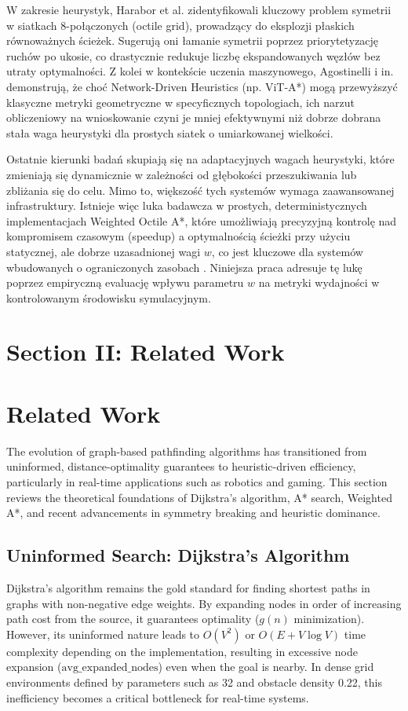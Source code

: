 \documentclass[conference]{IEEEtran}
\begin{document}
W zakresie heurystyk, Harabor et al. \cite{harabor2023octile} zidentyfikowali kluczowy problem symetrii w siatkach 8-połączonych (octile grid), prowadzący do eksplozji płaskich równoważnych ścieżek. Sugerują oni łamanie symetrii poprzez priorytetyzację ruchów po ukosie, co drastycznie redukuje liczbę ekspandowanych węzłów bez utraty optymalności. Z kolei w kontekście uczenia maszynowego, Agostinelli i in. \cite{agostinelli2024learned} demonstrują, że choć Network-Driven Heuristics (np. ViT-A*) mogą przewyższyć klasyczne metryki geometryczne w specyficznych topologiach, ich narzut obliczeniowy na wnioskowanie czyni je mniej efektywnymi niż dobrze dobrana stała waga heurystyki dla prostych siatek o umiarkowanej wielkości.

Ostatnie kierunki badań \cite{chen2024focal, shperberg2024deadline} skupiają się na adaptacyjnych wagach heurystyki, które zmieniają się dynamicznie w zależności od głębokości przeszukiwania lub zbliżania się do celu. Mimo to, większość tych systemów wymaga zaawansowanej infrastruktury. Istnieje więc luka badawcza w prostych, deterministycznych implementacjach Weighted Octile A*, które umożliwiają precyzyjną kontrolę nad kompromisem czasowym (speedup) a optymalnością ścieżki przy użyciu statycznej, ale dobrze uzasadnionej wagi \(w\), co jest kluczowe dla systemów wbudowanych o ograniczonych zasobach \cite{zhang2025hardware}. Niniejsza praca adresuje tę lukę poprzez empiryczną evaluację wpływu parametru \(w\) na metryki wydajności w kontrolowanym środowisku symulacyjnym.

\section{Section II: Related Work}
\section{Related Work}
\label{sec:related_work}

The evolution of graph-based pathfinding algorithms has transitioned from uninformed, distance-optimality guarantees to heuristic-driven efficiency, particularly in real-time applications such as robotics and gaming. This section reviews the theoretical foundations of Dijkstra's algorithm, A* search, Weighted A*, and recent advancements in symmetry breaking and heuristic dominance.

\subsection{Uninformed Search: Dijkstra's Algorithm}
Dijkstra's algorithm \cite{dijkstra1959note} remains the gold standard for finding shortest paths in graphs with non-negative edge weights. By expanding nodes in order of increasing path cost from the source, it guarantees optimality ($g(n)$ minimization). However, its uninformed nature leads to $O(V^2)$ or $O(E + V \log V)$ time complexity depending on the implementation, resulting in excessive node expansion ($\text{avg\_expanded\_nodes}$) even when the goal is nearby. In dense grid environments defined by parameters such as 32 and obstacle density 0.22, this inefficiency becomes a critical bottleneck for real-time systems.
\end{document}
